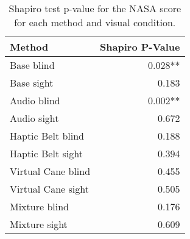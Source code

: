 
\begin{table}[!htb]
\centering
\caption{Shapiro test p-value for the NASA score for each method and visual condition.}
\label{tab:shapiro_nasa_score}
\begin{tabular}{lr}
\toprule
            Method & Shapiro P-Value \\
\midrule
        Base blind &         0.028** \\
        Base sight &           0.183 \\
       Audio blind &         0.002** \\
       Audio sight &           0.672 \\
 Haptic Belt blind &           0.188 \\
 Haptic Belt sight &           0.394 \\
Virtual Cane blind &           0.455 \\
Virtual Cane sight &           0.505 \\
     Mixture blind &           0.176 \\
     Mixture sight &           0.609 \\
\bottomrule
\end{tabular}
\end{table}

